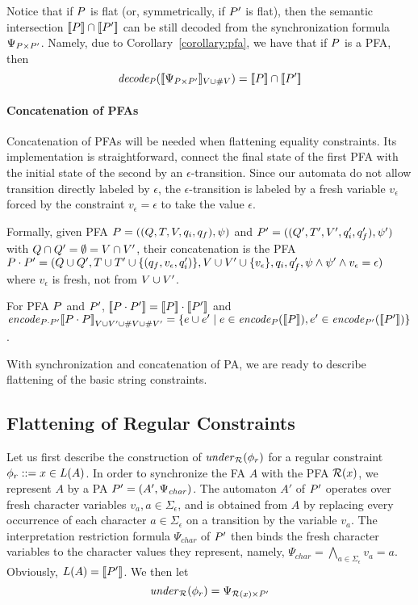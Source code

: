 \documentclass[sigplan,review,anonymous]{acmart}\settopmatter{printfolios=true,printccs=false,printacmref=false}
\begin{document}
Notice that if $P$ is flat (or, symmetrically, if $P'$ is flat), then the semantic intersection $[\![P]\!] \cap [\![P']\!]$ can be still decoded from the synchronization formula $\Psi_{P \times P'}$. 
Namely, due to Corollary~\ref{corollary:pfa}, we have that if $P$ is a PFA, then
$$
\mathit{decode_{P}} ([\![\Psi_{P \times P'}]\!]_{V\cup \#{V}}) = [\![P]\!] \cap [\![P']\!]
$$  

\paragraph{Concatenation of PFAs}
Concatenation of PFAs will be needed when flattening equality constraints. Its implementation is straightforward, connect the final state of the first PFA with the initial state of the second by an $\epsilon$-transition. Since our automata do not allow transition directly labeled by $\epsilon$, 
the $\epsilon$-transition is labeled by a fresh variable $v_\epsilon$ forced by the constraint $v_\epsilon = \epsilon$ to take the value $\epsilon$.  

Formally, given PFA $P = ((Q,T,V,q_i,q_f),\psi)$ and ${P'} = ((Q',T',V',q_i',q_f'),\psi')$ with $Q\cap Q'=\emptyset = V\cap V'$, 
their concatenation is the PFA $P\cdot P' = (Q\cup Q',T\cup T'\cup \{(q_f,v_\epsilon,q_i')\},V\cup V'\cup\{v_\epsilon\},q_i,q_f',\psi\land\psi'\land v_\epsilon = \epsilon)$ where $v_\epsilon$ is fresh, not from $V\cup V'$. 

\begin{lemma}
For PFA $P$ and $P'$,  
$[\![P\cdot P']\!] = [\![P]\!]\cdot[\![P']\!]$ and 
$\mathit{encode}_{P\cdot P'}{[\![P\cdot P]\!]}_{V\cup V' \cup \#{V}\cup\#{V'}} =
\{e \cup e'\mid e \in \mathit{encode}_{P} ([\![P]\!]),\\ e' \in\mathit{encode}_{P'} ([\![P']\!])\}$.
\end{lemma}

With synchronization and concatenation of PA, we are ready to describe flattening of the basic string constraints.

\subsection{Flattening of Regular Constraints} \label{section:mem}

Let us first describe the construction of $\mathit{under}_{\mathcal{R}}(\phi_r)$ for a regular constraint $\phi_r ::= x \in L(A)$. 
In order to synchronize the FA $A$ with the PFA $\mathcal{R}(x)$, 
we represent $A$ by a PA $P' = (A',\Psi_{\mathit{char}})$.
The automaton $A'$ of $P'$ operates over fresh character variables $v_a, a\in\Sigma_\epsilon$, 
and is obtained from $A$ by replacing every occurrence of each character $a\in\Sigma_{\epsilon}$ on a transition by the variable $v_a$. 
The interpretation restriction formula $\Psi_{\mathit{char}}$ of $P'$ then binds the fresh character variables to the character values they represent, 
namely, $\Psi_{\mathit{char}} = \bigwedge_{a\in\Sigma_\epsilon} v_a = a$. Obviously, $L(A) = [\![P']\!]$. 
We then let 
$$\mathit{under}_{\mathcal{R}}(\phi_r) = \Psi_{\mathcal{R}(x) \times P'}$$ 
\end{document}
